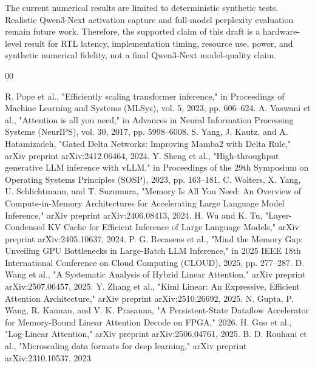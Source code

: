 ﻿\documentclass[conference]{IEEEtran}
\begin{document}
The current numerical results are limited to deterministic synthetic tests. Realistic Qwen3-Next activation capture and full-model perplexity evaluation remain future work. Therefore, the supported claim of this draft is a hardware-level result for RTL latency, implementation timing, resource use, power, and synthetic numerical fidelity, not a final Qwen3-Next model-quality claim.

\begin{thebibliography}{00}

 R. Pope et al., "Efficiently scaling transformer inference," in Proceedings of Machine Learning and Systems (MLSys), vol. 5, 2023, pp. 606--624.
 A. Vaswani et al., "Attention is all you need," in Advances in Neural Information Processing Systems (NeurIPS), vol. 30, 2017, pp. 5998--6008.
 S. Yang, J. Kautz, and A. Hatamizadeh, "Gated Delta Networks: Improving Mamba2 with Delta Rule," arXiv preprint arXiv:2412.06464, 2024.
 Y. Sheng et al., "High-throughput generative LLM inference with vLLM," in Proceedings of the 29th Symposium on Operating Systems Principles (SOSP), 2023, pp. 163--181.
 C. Wolters, X. Yang, U. Schlichtmann, and T. Suzumura, "Memory Is All You Need: An Overview of Compute-in-Memory Architectures for Accelerating Large Language Model Inference," arXiv preprint arXiv:2406.08413, 2024.
 H. Wu and K. Tu, "Layer-Condensed KV Cache for Efficient Inference of Large Language Models," arXiv preprint arXiv:2405.10637, 2024.
 P. G. Recasens et al., "Mind the Memory Gap: Unveiling GPU Bottlenecks in Large-Batch LLM Inference," in 2025 IEEE 18th International Conference on Cloud Computing (CLOUD), 2025, pp. 277--287.
 D. Wang et al., "A Systematic Analysis of Hybrid Linear Attention," arXiv preprint arXiv:2507.06457, 2025.
 Y. Zhang et al., "Kimi Linear: An Expressive, Efficient Attention Architecture," arXiv preprint arXiv:2510.26692, 2025.
 N. Gupta, P. Wang, R. Kannan, and V. K. Prasanna, "A Persistent-State Dataflow Accelerator for Memory-Bound Linear Attention Decode on FPGA," 2026.
 H. Guo et al., "Log-Linear Attention," arXiv preprint arXiv:2506.04761, 2025.
 B. D. Rouhani et al., "Microscaling data formats for deep learning," arXiv preprint arXiv:2310.10537, 2023.

\end{thebibliography}
\end{document}
